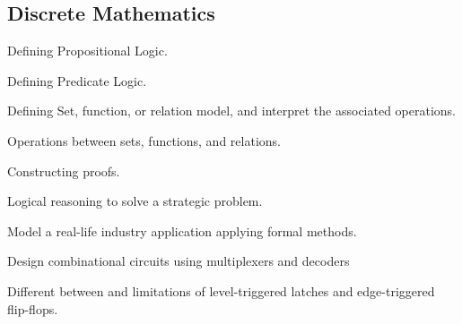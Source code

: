 \documentclass[options]{article}
\newcommand{\cmark}{\ding{51}}%
\newcommand{\done}{\rlap{$\square$}{\raisebox{2pt}{\large\hspace{1pt}\cmark}}%
  \hspace{-2.5pt}}
\begin{document}
\subsection{Discrete Mathematics}

\begin{todolist}
\item[\done] Defining Propositional Logic.
\item[\done] Defining Predicate Logic.
\item[\done] Defining Set, function, or relation model, and interpret the associated operations.
\item[\done] Operations between sets, functions, and relations.
\item[\done] Constructing proofs.
\item[\done] Logical reasoning to solve a strategic problem.
\item[\done] Model a real-life industry application applying formal methods.
\end{todolist}

\begin{todolist}
\item[\done] Design combinational circuits using multiplexers and decoders
\item[\done] Different between and limitations of level-triggered latches and edge-triggered flip-flops.
\end{todolist}
\end{document}
